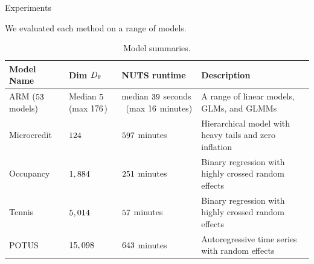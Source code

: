 \documentclass[8pt]{beamer}\usepackage[]{graphicx}\usepackage[]{color}
\begin{document}
\begin{frame}{Experiments}

    We evaluated each method on a range of models.
    
    \begin{table}[h!]
        \begin{tabular}{|x{0.15\textwidth}|x{0.13\textwidth}|x{0.25\textwidth}|x{0.3\textwidth}|}
        \hline\hline
        Model Name  & Dim ${D_{\theta}}$     & NUTS runtime & Description \\
        \hline\hline
        ARM  \newline ($53$ models) &
        Median $5$ 
            \newline(max $176$)&
        median $39$ seconds \
            \newline(max $16$ minutes) 
            &
           A range of linear models, GLMs, and GLMMs \\
        \hline
        Microcredit & $124$ & $597$ minutes &
           Hierarchical model with heavy tails and zero inflation \\
        \hline
        Occupancy & $1,884$ & $251$ minutes &
           Binary regression with highly crossed random effects \\
        \hline
        Tennis & $5,014$ & $57$ minutes &
           Binary regression with highly crossed random effects \\
        \hline
        POTUS & $15,098$ & $643$ minutes &
            Autoregressive time series with random effects \\
        \hline\hline
        \end{tabular}
        \caption{Model summaries.}
        \label{tab:model_desc}
    \end{table}
        
\end{frame}

\end{document}
